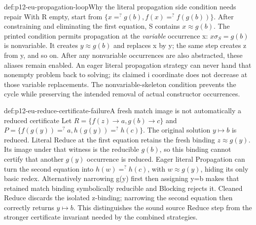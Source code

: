 \begin{hbexample}{def:p12-eu-propagation-loop}{Why the literal propagation side condition needs repair}
With R empty, start from
\(\{x=^{?}g(b),f(x)=^{?}f(g(b))\}\). After constraining and
eliminating the first equation, S contains \(x\approx g(b)\).
The printed condition permits propagation at the \emph{variable}
occurrence x: \(x\sigma_S=g(b)\) is nonvariable. It creates
\(y\approx g(b)\) and replaces x by y; the same step creates z
from y, and so on. After any nonvariable occurrences are also
abstracted, these aliases remain enabled. An eager literal propagation
strategy can never hand that nonempty problem back to solving; its
claimed i coordinate does not decrease at those variable replacements.
The nonvariable-skeleton condition prevents the cycle while preserving
the intended removal of actual constructor occurrences.
\cite[Propagation and its measure, p.~502]{BaaderSnyder2001}
\end{hbexample}

\begin{hbexample}{def:p12-eu-reduce-certificate-failure}{A fresh match image is not automatically a reduced certificate}
Let \(R=\{f(z)\to a,g(b)\to c\}\) and
\(P=\{f(g(y))=^{?}a,h(g(y))=^{?}h(c)\}\).
The original solution \(y\mapsto b\) is reduced. Literal Reduce
at the first equation retains the fresh binding \(z\approx g(y)\).
Its image under that witness is the reducible \(g(b)\), so this
binding cannot certify that another \(g(y)\) occurrence is reduced.
Eager literal Propagation can turn the second equation into
\(h(w)=^{?}h(c)\), with \(w\approx g(y)\), hiding its only
basic redex. Alternatively narrowing g(y) first then assigning y=b
makes that retained match binding symbolically reducible and Blocking
rejects it. Cleaned Reduce discards the isolated z-binding; narrowing
the second equation then correctly returns \(y\mapsto b\).
This distinguishes the sound source Reduce step from the stronger
certificate invariant needed by the combined strategies.
\end{hbexample}

